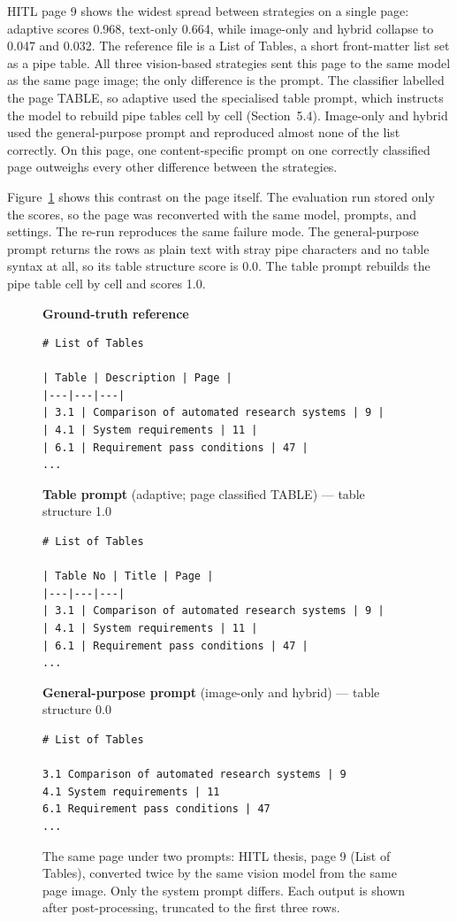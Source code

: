 HITL page 9 shows the widest spread between strategies on a single page:
adaptive scores 0.968, text-only 0.664, while image-only and hybrid collapse
to 0.047 and 0.032. The reference file is a List of Tables, a short
front-matter list set as a pipe table. All three vision-based strategies
sent this page to the same model as the same page image; the only difference
is the prompt. The classifier labelled the page TABLE, so adaptive used the
specialised table prompt, which instructs the model to rebuild pipe tables
cell by cell (Section~5.4). Image-only and hybrid used the general-purpose
prompt and reproduced almost none of the list correctly. On this page, one
content-specific prompt on one correctly classified page outweighs every
other difference between the strategies.

Figure~\ref{fig:page9_prompts} shows this contrast on the page itself.
The evaluation run stored only the scores, so the page was reconverted with
the same model, prompts, and settings. The re-run reproduces the same
failure mode. The general-purpose prompt returns the rows as plain text
with stray pipe characters and no table syntax at all, so its table
structure score is 0.0. The table prompt rebuilds the pipe table cell by
cell and scores 1.0.

\begin{figure}[ht]
\medskip\noindent\textbf{Ground-truth reference}
\begin{lstlisting}[language={},nolol,identifierstyle=\color{black},basicstyle=\footnotesize\ttfamily\color{black}]
# List of Tables

| Table | Description | Page |
|---|---|---|
| 3.1 | Comparison of automated research systems | 9 |
| 4.1 | System requirements | 11 |
| 6.1 | Requirement pass conditions | 47 |
...
\end{lstlisting}

\medskip\noindent\textbf{Table prompt} (adaptive; page classified TABLE) --- table structure 1.0
\begin{lstlisting}[language={},nolol,identifierstyle=\color{black},basicstyle=\footnotesize\ttfamily\color{black}]
# List of Tables

| Table No | Title | Page |
|---|---|---|
| 3.1 | Comparison of automated research systems | 9 |
| 4.1 | System requirements | 11 |
| 6.1 | Requirement pass conditions | 47 |
...
\end{lstlisting}

\medskip\noindent\textbf{General-purpose prompt} (image-only and hybrid) --- table structure 0.0
\begin{lstlisting}[language={},nolol,identifierstyle=\color{black},basicstyle=\footnotesize\ttfamily\color{black}]
# List of Tables

3.1 Comparison of automated research systems | 9
4.1 System requirements | 11
6.1 Requirement pass conditions | 47
...
\end{lstlisting}
\caption{The same page under two prompts: HITL thesis, page 9 (List of
Tables), converted twice by the same vision model from the same page image.
Only the system prompt differs. Each output is shown after post-processing,
truncated to the first three rows.}
\label{fig:page9_prompts}
\end{figure}

